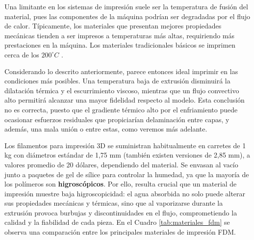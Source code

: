 Una limitante en los sistemas de impresión suele ser la temperatura de fusión del material, pues las componentes de la máquina podrían ser degradadas por el flujo de calor. Típicamente, los materiales que presentan mejores propiedades mecánicas tienden a ser impresos a temperaturas más altas, requiriendo más prestaciones en la máquina. Los materiales tradicionales básicos se imprimen cerca de los $200^{\circ}C$ .

Considerando lo descrito anteriormente, parece entonces ideal imprimir en las condiciones más  posibles. Una temperatura baja de extrusión disminuirá la dilatación térmica y el escurrimiento viscoso, mientras que un flujo convectivo alto permitirá alcanzar una mayor fidelidad respecto al modelo. Esta conclusión no es correcta, puesto que el gradiente térmico alto por el enfriamiento puede ocasionar esfuerzos residuales que propiciarían delaminación entre capas, y además, una mala unión o  entre estas, como veremos más adelante.

Los filamentos para impresión 3D se suministran habitualmente en carretes de 1 kg con diámetros estándar de 1,75 mm (también existen versiones de 2,85 mm), a valores promedio de 20 dólares, dependiendo del material. Se envasan al vacío junto a paquetes de gel de sílice para controlar la humedad, ya que la mayoría de los polímeros son \textbf{higroscópicos}. Por ello, resulta crucial que un material de impresión muestre baja higroscopicidad: el agua absorbida no solo puede alterar sus propiedades mecánicas y térmicas, sino que al vaporizarse durante la extrusión provoca burbujas y discontinuidades en el flujo, comprometiendo la calidad y la fiabilidad de cada pieza. En el Cuadro \ref{tab:materiales_fdm} se observa una comparación entre los principales materiales de impresión FDM.

